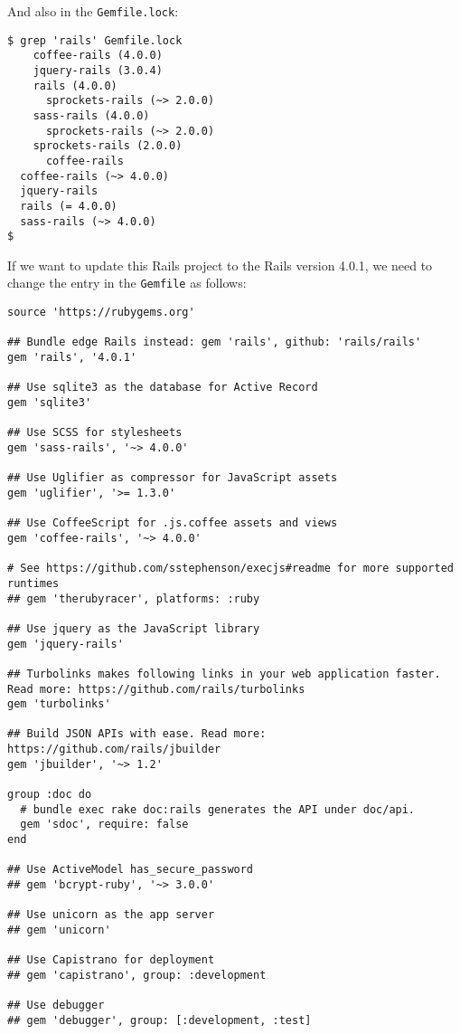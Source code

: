 \documentclass[a4paper]{book}
\newcounter{tab}[chapter]
\begin{document}
And also in the \texttt{Gemfile.lock}:

\begin{shaded}\begin{verbatim}
$ grep 'rails' Gemfile.lock
    coffee-rails (4.0.0)
    jquery-rails (3.0.4)
    rails (4.0.0)
      sprockets-rails (~> 2.0.0)
    sass-rails (4.0.0)
      sprockets-rails (~> 2.0.0)
    sprockets-rails (2.0.0)
      coffee-rails
  coffee-rails (~> 4.0.0)
  jquery-rails
  rails (= 4.0.0)
  sass-rails (~> 4.0.0)
$
\end{verbatim}\end{shaded}

If we want to update this Rails project to the Rails version 4.0.1, we need to change the entry in the \texttt{Gemfile} as follows:

\begin{shaded}\begin{verbatim}
source 'https://rubygems.org'

## Bundle edge Rails instead: gem 'rails', github: 'rails/rails'
gem 'rails', '4.0.1'

## Use sqlite3 as the database for Active Record
gem 'sqlite3'

## Use SCSS for stylesheets
gem 'sass-rails', '~> 4.0.0'

## Use Uglifier as compressor for JavaScript assets
gem 'uglifier', '>= 1.3.0'

## Use CoffeeScript for .js.coffee assets and views
gem 'coffee-rails', '~> 4.0.0'

# See https://github.com/sstephenson/execjs#readme for more supported runtimes
## gem 'therubyracer', platforms: :ruby

## Use jquery as the JavaScript library
gem 'jquery-rails'

## Turbolinks makes following links in your web application faster. Read more: https://github.com/rails/turbolinks
gem 'turbolinks'

## Build JSON APIs with ease. Read more: https://github.com/rails/jbuilder
gem 'jbuilder', '~> 1.2'

group :doc do
  # bundle exec rake doc:rails generates the API under doc/api.
  gem 'sdoc', require: false
end

## Use ActiveModel has_secure_password
## gem 'bcrypt-ruby', '~> 3.0.0'

## Use unicorn as the app server
## gem 'unicorn'

## Use Capistrano for deployment
## gem 'capistrano', group: :development

## Use debugger
## gem 'debugger', group: [:development, :test]
\end{verbatim}\end{shaded}
\end{document}
